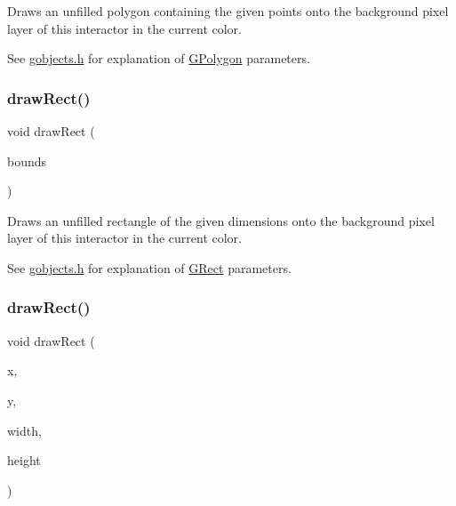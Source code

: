 Draws an unfilled polygon containing the given points onto the background pixel layer of this interactor in the current color. 

See \mbox{\hyperlink{gobjects_8h_source}{gobjects.\+h}} for explanation of \mbox{\hyperlink{classGPolygon}{G\+Polygon}} parameters. \mbox{\label{classGDrawingSurface_a3dd4cc5891149dfc36746264f7289877}} 
\subsubsection{\texorpdfstring{draw\+Rect()}{drawRect()}\hspace{0.1cm}{\footnotesize\ttfamily [1/2]}}
{\footnotesize\ttfamily void draw\+Rect (\begin{DoxyParamCaption}\item[{const \mbox{\hyperlink{classGRectangle}{G\+Rectangle}} \&}]{bounds }\end{DoxyParamCaption})\hspace{0.3cm}{\ttfamily [virtual]}}



Draws an unfilled rectangle of the given dimensions onto the background pixel layer of this interactor in the current color. 

See \mbox{\hyperlink{gobjects_8h_source}{gobjects.\+h}} for explanation of \mbox{\hyperlink{classGRect}{G\+Rect}} parameters. \mbox{\label{classGDrawingSurface_a4148e770ffc5474153aadd4814dbd708}} 
\subsubsection{\texorpdfstring{draw\+Rect()}{drawRect()}\hspace{0.1cm}{\footnotesize\ttfamily [2/2]}}
{\footnotesize\ttfamily void draw\+Rect (\begin{DoxyParamCaption}\item[{double}]{x,  }\item[{double}]{y,  }\item[{double}]{width,  }\item[{double}]{height }\end{DoxyParamCaption})\hspace{0.3cm}{\ttfamily [virtual]}}



